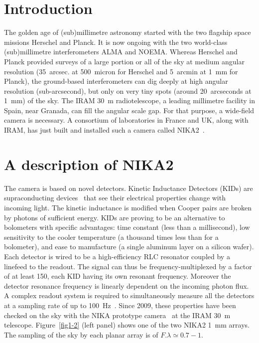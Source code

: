 \documentclass{sf2a-conf2016}
\begin{document}
\section{Introduction}
The golden age of (sub)millimetre astronomy started with the two flagship
space missions Herschel and Planck. It is now ongoing with the two world-class
(sub)millimetre interferometers ALMA and NOEMA. Whereas Herschel and Planck
provided surveys of a large portion or all of the sky at medium angular
resolution (35~arcsec. at 500~micron for Herschel and 5~arcmin at 1~mm for
Planck), the ground-based interferometers can dig deeply at high angular
resolution (sub-arcsecond), but only on very tiny spots (around 20~arcseconds
at 1~mm) of the sky. The IRAM 30~m radiotelescope, a leading millimetre
facility in Spain, near Granada, can fill the angular scale gap. For that
purpose, a wide-field camera is necessary. A consortium of laboratories in
France and UK, along with IRAM, has just built and installed such a camera
called NIKA2~\citep[more details given
in][\href{http://ipag.osug.fr/nika2}{see also
  http://ipag.osug.fr/nika2}]{2016arXiv160508628C}.
  
\section{A description of NIKA2}
The camera is based on novel detectors. Kinetic Inductance Detectors (KIDs)
are supraconducting devices~\citep{2003Natur.425..817D,2006SPIE.6275E..1OD} that
see their electrical properties change with incoming light. The kinetic
inductance is modified when Cooper pairs are broken by photons of sufficient
energy. KIDs are proving to be an alternative to bolometers with specific
advantages: time constant (less than a millisecond), low sensitivity to the
cooler temperature (a thousand times less than for a bolometer), and ease to
manufacture (a single aluminum layer on a silicon wafer). Each detector is
wired to be a high-efficiency RLC resonator coupled by a linefeed to the
readout. The signal can thus be frequency-multiplexed by a factor of at least
150, each KID having its own resonant frequency. Moreover the detector
resonance frequency is linearly dependent on the incoming photon flux. A
complex readout system is required to simultaneously measure all the detectors
at a sampling rate of up to 100~Hz~\citep{bourrion2011}. Since 2009, these
properties have been checked on the sky with the NIKA prototype
camera~\citep{monfardini2010,monfardini2011,Calvo2013,catalano2014} at the
IRAM 30~m telescope. Figure~\ref{fig1-2} (left panel) shows one of the two
NIKA2 1~mm arrays. The sampling of the sky by each planar array is of
$F.\lambda\simeq 0.7-1$.
\end{document}
